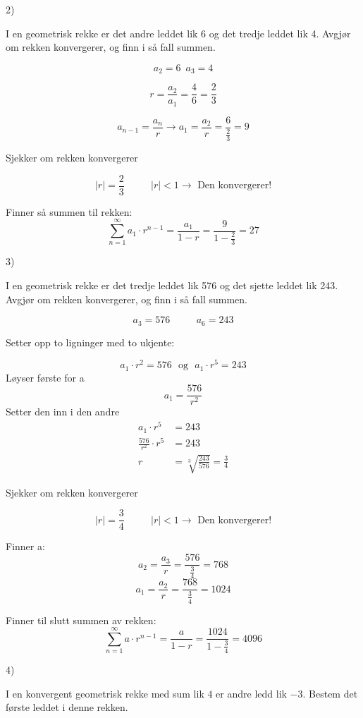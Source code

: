 \documentclass[11pt]{article}
\theoremstyle{definition}
\theoremstyle{definition}
\theoremstyle{definition}
\theoremstyle{definition}
\theoremstyle{definition}
\theoremstyle{definition}
\begin{document}
	    2) 
	    
	    I en geometrisk rekke er det andre leddet lik 6 og det tredje leddet lik 4. Avgjør om rekken konvergerer, og finn i så fall summen.
	    
	    \[a_2=6 \,\,\, a_3=4 \]
	    
	    \[r=\frac{a_2}{a_1}=\frac{4}{6}=\frac{2}{3}\]
	    
		 \[a_{n-1}=\frac{a_n}{r}\rightarrow a_1=\frac{a_2}{r}=\frac{6}{\frac{2}{3}}=9 \]
		    
		 Sjekker om rekken konvergerer
		 
		 \[|r|=\frac{2}{3}\hspace{32pt} |r|<1\rightarrow\text{ Den konvergerer!}\]
		 
		 Finner så summen til rekken:
		 \[\sum_{n=1}^{\infty}a_1\cdot r^{n-1}=\dfrac{a_1}{1-r}=\dfrac{9}{1-\frac{2}{3}}=27\]
		 
	    \newpage
	    
	    3)
	    
	    I en geometrisk rekke er det tredje leddet lik 576 og det sjette leddet lik 243. Avgjør om rekken konvergerer, og finn i så fall summen.
	    
	    \[a_3=576 \hspace{32pt} a_6=243\]
		 
		Setter opp to ligninger med to ukjente:
	    
		\[a_1\cdot r^2=576  \,\,\text{ og }\,\, a_1\cdot r^5=243 \]		
		Løyser første for a
		\[a_1=\frac{576}{r^2}\]
		Setter den inn i den andre
	    \begin{align*}
	    a_1\cdot r^5 &= 243\\
	    \frac{576}{r^2}\cdot r^5&=243\\
	    r&=\sqrt[3]{\frac{243}{576}}=\frac{3}{4}
	    \end{align*}
	    
	    
	    Sjekker om rekken konvergerer
	    
	    \[|r|=\frac{3}{4}\hspace{32pt} |r|<1\rightarrow\text{ Den konvergerer!}\]
	    
		Finner a:
		\[a_2=\frac{a_3}{r}=\frac{576}{\frac{3}{4}}=768\]
		\[a_1=\frac{a_2}{r}=\frac{768}{\frac{3}{4}}=1024\]
		
		Finner til slutt summen av rekken:
		\[\sum_{n=1}^{\infty}a\cdot r^{n-1}=\dfrac{a}{1-r}=\dfrac{1024}{1-\frac{3}{4}}=4096\]
		\newpage
		
		4)
		
        I en konvergent geometrisk rekke med sum lik \(4\) er andre ledd lik \(-3\). Bestem det første leddet i denne rekken.
		
\end{document}
